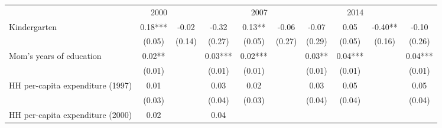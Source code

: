 \begin{tabular}{llllllllll}
\cline{1-10}
\multicolumn{1}{c}{} &
  \multicolumn{1}{|r}{2000} &
  \multicolumn{1}{r}{} &
  \multicolumn{1}{r}{} &
  \multicolumn{1}{r}{2007} &
  \multicolumn{1}{r}{} &
  \multicolumn{1}{r}{} &
  \multicolumn{1}{r}{2014} &
  \multicolumn{1}{r}{} &
  \multicolumn{1}{r}{} \\
\cline{1-10}
\multicolumn{1}{l}{Kindergarten} &
  \multicolumn{1}{|c}{0.18***} &
  \multicolumn{1}{c}{-0.02 } &
  \multicolumn{1}{c}{-0.32 } &
  \multicolumn{1}{c}{0.13** } &
  \multicolumn{1}{c}{-0.06 } &
  \multicolumn{1}{c}{-0.07 } &
  \multicolumn{1}{c}{0.05 } &
  \multicolumn{1}{c}{-0.40** } &
  \multicolumn{1}{c}{-0.10 } \\
\multicolumn{1}{l}{} &
  \multicolumn{1}{|c}{(0.05)} &
  \multicolumn{1}{c}{(0.14)} &
  \multicolumn{1}{c}{(0.27)} &
  \multicolumn{1}{c}{(0.05)} &
  \multicolumn{1}{c}{(0.27)} &
  \multicolumn{1}{c}{(0.29)} &
  \multicolumn{1}{c}{(0.05)} &
  \multicolumn{1}{c}{(0.16)} &
  \multicolumn{1}{c}{(0.26)} \\
\multicolumn{1}{l}{Mom's years of education} &
  \multicolumn{1}{|c}{0.02** } &
  \multicolumn{1}{c}{} &
  \multicolumn{1}{c}{0.03***} &
  \multicolumn{1}{c}{0.02***} &
  \multicolumn{1}{c}{} &
  \multicolumn{1}{c}{0.03** } &
  \multicolumn{1}{c}{0.04***} &
  \multicolumn{1}{c}{} &
  \multicolumn{1}{c}{0.04***} \\
\multicolumn{1}{l}{} &
  \multicolumn{1}{|c}{(0.01)} &
  \multicolumn{1}{c}{} &
  \multicolumn{1}{c}{(0.01)} &
  \multicolumn{1}{c}{(0.01)} &
  \multicolumn{1}{c}{} &
  \multicolumn{1}{c}{(0.01)} &
  \multicolumn{1}{c}{(0.01)} &
  \multicolumn{1}{c}{} &
  \multicolumn{1}{c}{(0.01)} \\
\multicolumn{1}{l}{HH per-capita expenditure (1997)} &
  \multicolumn{1}{|c}{0.01 } &
  \multicolumn{1}{c}{} &
  \multicolumn{1}{c}{0.03 } &
  \multicolumn{1}{c}{0.02 } &
  \multicolumn{1}{c}{} &
  \multicolumn{1}{c}{0.03 } &
  \multicolumn{1}{c}{0.05 } &
  \multicolumn{1}{c}{} &
  \multicolumn{1}{c}{0.05 } \\
\multicolumn{1}{l}{} &
  \multicolumn{1}{|c}{(0.03)} &
  \multicolumn{1}{c}{} &
  \multicolumn{1}{c}{(0.04)} &
  \multicolumn{1}{c}{(0.03)} &
  \multicolumn{1}{c}{} &
  \multicolumn{1}{c}{(0.04)} &
  \multicolumn{1}{c}{(0.04)} &
  \multicolumn{1}{c}{} &
  \multicolumn{1}{c}{(0.04)} \\
\multicolumn{1}{l}{HH per-capita expenditure (2000)} &
  \multicolumn{1}{|c}{0.02 } &
  \multicolumn{1}{c}{} &
  \multicolumn{1}{c}{0.04 } &

\end{tabular}
